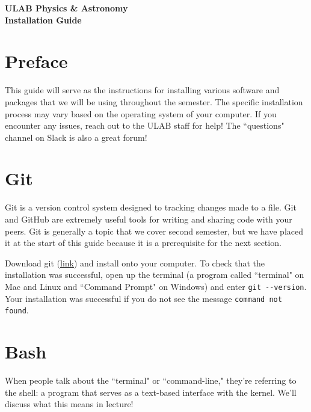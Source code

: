 \documentclass[12pt]{article}
\numberwithin{equation}{section}
\begin{document}
	
	\vspace*{-3cm}{\footnotesize\hfill Copyright \copyright\ 2021, Undergraduate Lab at Berkeley}
	\vspace{0.5cm}
	
	\begin{center}
			\textbf{\Large{ULAB Physics \& Astronomy\\Installation Guide}}
	\end{center}

	\tableofcontents

	\section{Preface}
	
	This guide will serve as the instructions for installing various software and packages that we will be using throughout the semester. The specific installation process may vary based on the operating system of your computer. If you encounter any issues, reach out to the ULAB staff for help! The ``questions" channel on Slack is also a great forum!
	
	\section{Git}
	
	Git is a version control system designed to tracking changes made to a file. Git and GitHub are extremely useful tools for writing and sharing code with your peers. Git is generally a topic that we cover second semester, but we have placed it at the start of this guide because it is a prerequisite for the next section.
	
	Download git (\hyperref{https://git-scm.com/downloads}{}{}{link}) and install onto your computer. To check that the installation was successful, open up the terminal (a program called ``terminal" on Mac and Linux and ``Command Prompt" on Windows) and enter \verb|git --version|. Your installation was successful if you do not see the message \verb|command not found|.
	
	\section{Bash}
	
	When people talk about the ``terminal" or ``command-line," they're referring to the shell: a program that serves as a text-based interface with the kernel. We'll discuss what this means in lecture! 
	
\end{document}
